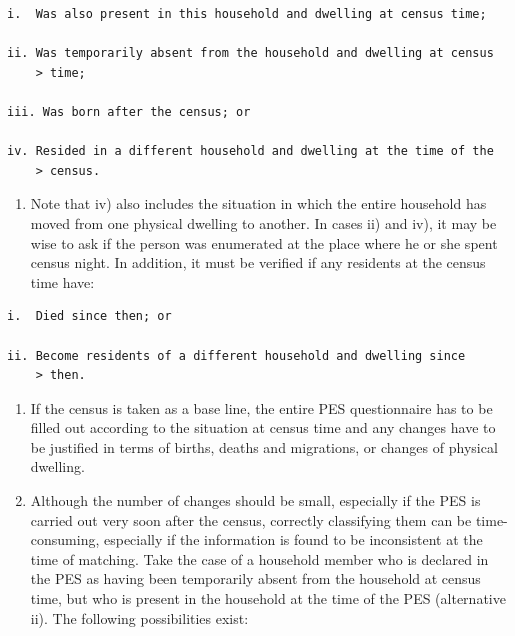 \documentclass[
]{article}
\providecommand{\tightlist}{%
  \setlength{\itemsep}{0pt}\setlength{\parskip}{0pt}}
\begin{document}
\begin{verbatim}
i.  Was also present in this household and dwelling at census time;

ii. Was temporarily absent from the household and dwelling at census
    > time;

iii. Was born after the census; or

iv. Resided in a different household and dwelling at the time of the
    > census.
\end{verbatim}

\begin{enumerate}
\def\labelenumi{\arabic{enumi}.}
\setcounter{enumi}{115}
\tightlist
\item
  Note that iv) also includes the situation in which the entire
  household has moved from one physical dwelling to another. In
  cases ii) and iv), it may be wise to ask if the person was
  enumerated at the place where he or she spent census night. In
  addition, it must be verified if any residents at the census time
  have:
\end{enumerate}

\begin{verbatim}
i.  Died since then; or

ii. Become residents of a different household and dwelling since
    > then.
\end{verbatim}

\begin{enumerate}
\def\labelenumi{\arabic{enumi}.}
\setcounter{enumi}{116}
\item
  If the census is taken as a base line, the entire PES questionnaire
  has to be filled out according to the situation at census time and
  any changes have to be justified in terms of births, deaths and
  migrations, or changes of physical dwelling.
\item
  Although the number of changes should be small, especially if the
  PES is carried out very soon after the census, correctly classifying
  them can be time-consuming, especially if the information is found
  to be inconsistent at the time of matching. Take the case of a
  household member who is declared in the PES as having been
  temporarily absent from the household at census time, but who is
  present in the household at the time of the PES (alternative ii).
  The following possibilities exist:
\end{enumerate}
\end{document}

